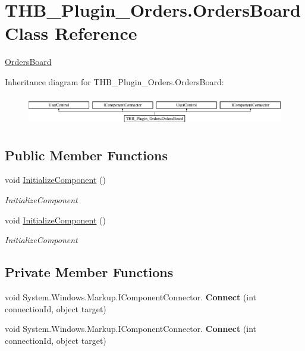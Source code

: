 \hypertarget{class_t_h_b___plugin___orders_1_1_orders_board}{}\section{T\+H\+B\+\_\+\+Plugin\+\_\+\+Orders.\+Orders\+Board Class Reference}
\label{class_t_h_b___plugin___orders_1_1_orders_board}


\mbox{\hyperlink{class_t_h_b___plugin___orders_1_1_orders_board}{Orders\+Board}}  


Inheritance diagram for T\+H\+B\+\_\+\+Plugin\+\_\+\+Orders.\+Orders\+Board\+:\begin{figure}[H]
\begin{center}
\leavevmode
\includegraphics[height=1.327014cm]{dd/d7c/class_t_h_b___plugin___orders_1_1_orders_board}
\end{center}
\end{figure}
\subsection*{Public Member Functions}
\begin{DoxyCompactItemize}
\item 
void \mbox{\hyperlink{class_t_h_b___plugin___orders_1_1_orders_board_a2ceb19fe78642e77f7e5ae462bc10e16}{Initialize\+Component}} ()
\begin{DoxyCompactList}\small\item\em Initialize\+Component \end{DoxyCompactList}\item 
void \mbox{\hyperlink{class_t_h_b___plugin___orders_1_1_orders_board_a2ceb19fe78642e77f7e5ae462bc10e16}{Initialize\+Component}} ()
\begin{DoxyCompactList}\small\item\em Initialize\+Component \end{DoxyCompactList}\end{DoxyCompactItemize}
\subsection*{Private Member Functions}
\begin{DoxyCompactItemize}
\item 
\mbox{\label{class_t_h_b___plugin___orders_1_1_orders_board_ada300d5554820e4bef6e5ef58e45e221}} 
void System.\+Windows.\+Markup.\+I\+Component\+Connector. {\bfseries Connect} (int connection\+Id, object target)
\item 
\mbox{\label{class_t_h_b___plugin___orders_1_1_orders_board_ada300d5554820e4bef6e5ef58e45e221}} 
void System.\+Windows.\+Markup.\+I\+Component\+Connector. {\bfseries Connect} (int connection\+Id, object target)
\end{DoxyCompactItemize}

